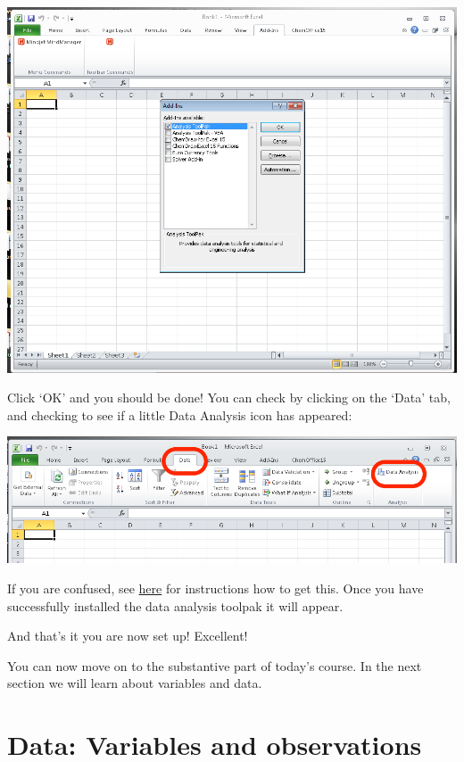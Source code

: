\documentclass[
]{book}
\begin{document}
\includegraphics{imgs/install_toolpak_after_go_popup.png}

Click `OK' and you should be done! You can check by clicking on the `Data' tab, and checking to see if a little Data Analysis icon has appeared:

\includegraphics{imgs/data_tab_analysis_appears.png}

If you are confused, see \href{https://support.office.com/en-gb/article/Load-the-Analysis-ToolPak-6a63e598-cd6d-42e3-9317-6b40ba1a66b4}{here} for instructions how to get this. Once you have successfully installed the data analysis toolpak it will appear.

And that's it you are now set up! Excellent!

You can now move on to the substantive part of today's course. In the next section we will learn about variables and data.

\hypertarget{data-variables-and-observations}{%
\section{Data: Variables and observations}\label{data-variables-and-observations}}
\end{document}
